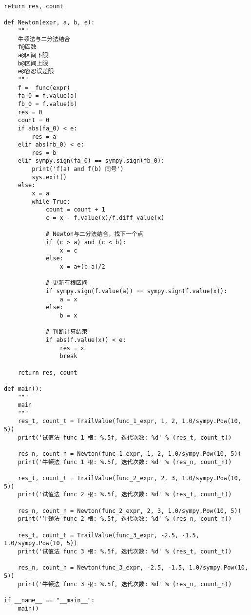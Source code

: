 \begin{lstlisting}[style = python]
    return res, count

def Newton(expr, a, b, e):
    """
    牛顿法与二分法结合
    f@函数
    a@区间下限
    b@区间上限
    e@容忍误差限
    """
    f = _func(expr)
    fa_0 = f.value(a)
    fb_0 = f.value(b)
    res = 0
    count = 0
    if abs(fa_0) < e:
        res = a
    elif abs(fb_0) < e:
        res = b
    elif sympy.sign(fa_0) == sympy.sign(fb_0):
        print('f(a) and f(b) 同号')
        sys.exit()
    else:
        x = a
        while True:
            count = count + 1
            c = x - f.value(x)/f.diff_value(x)

            # Newton与二分法结合，找下一个点
            if (c > a) and (c < b):
                x = c
            else:
                x = a+(b-a)/2

            # 更新有根区间
            if sympy.sign(f.value(a)) == sympy.sign(f.value(x)):
                a = x
            else:
                b = x

            # 判断计算结束
            if abs(f.value(x)) < e:
                res = x
                break

    return res, count
        
def main():
    """
    main
    """
    res_t, count_t = TrailValue(func_1_expr, 1, 2, 1.0/sympy.Pow(10, 5))
    print('试值法 func 1 根: %.5f, 迭代次数: %d' % (res_t, count_t))

    res_n, count_n = Newton(func_1_expr, 1, 2, 1.0/sympy.Pow(10, 5))
    print('牛顿法 func 1 根: %.5f, 迭代次数: %d' % (res_n, count_n))

    res_t, count_t = TrailValue(func_2_expr, 2, 3, 1.0/sympy.Pow(10, 5))
    print('试值法 func 2 根: %.5f, 迭代次数: %d' % (res_t, count_t))

    res_n, count_n = Newton(func_2_expr, 2, 3, 1.0/sympy.Pow(10, 5))
    print('牛顿法 func 2 根: %.5f, 迭代次数: %d' % (res_n, count_n))

    res_t, count_t = TrailValue(func_3_expr, -2.5, -1.5, 1.0/sympy.Pow(10, 5))
    print('试值法 func 3 根: %.5f, 迭代次数: %d' % (res_t, count_t))

    res_n, count_n = Newton(func_3_expr, -2.5, -1.5, 1.0/sympy.Pow(10, 5))
    print('牛顿法 func 3 根: %.5f, 迭代次数: %d' % (res_n, count_n))

if __name__ == "__main__":
    main()
\end{lstlisting}